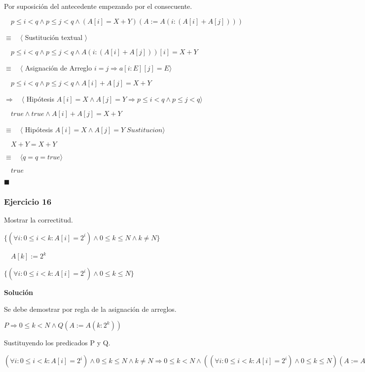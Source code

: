 \documentclass[hidelinks]{article}
\begin{document}
Por suposición del antecedente empezando por el consecuente.\par

$\quad p \leq i < q \land p \leq j < q \land (A[i] = X + Y)(A := A(i:(A[i]+A[j])))$\par
$\equiv \quad \langle$ Sustitución textual $ \rangle$\par
$\quad p \leq i < q \land p \leq j < q \land A(i:(A[i]+A[j]))[i] = X + Y$\par
$\equiv \quad \langle$ Asignación de Arreglo $ i = j \Rightarrow a[i:E][j] = E \rangle$\par
$\quad p \leq i < q \land p \leq j < q \land A[i]+A[j] = X + Y$\par
$\Rightarrow \quad \langle$ Hipótesis $ A[i] = X \land A[j] = Y \Rightarrow p \leq i < q \land p \leq j < q \rangle$\par
$\quad true \land true \land A[i]+A[j] = X + Y$\par
$\equiv \quad \langle$ Hipótesis $ A[i] = X \land A[j] = Y \; Sustitucion \rangle$\par
$\quad  X + Y = X + Y$\par
$\equiv \quad \langle q = q = true \rangle $\par
$\quad  true$\par
$\blacksquare$\par

\newpage

\subsubsection{Ejercicio 16}


Mostrar la correctitud.\par
$\{ (\forall i : 0 \leq i < k : A[i] = 2^i) \land 0 \leq k \leq N \land k \neq N\}$\par
$\quad A[k] := 2^k$\par
$\{ (\forall i : 0 \leq i < k : A[i] = 2^i) \land 0 \leq k \leq N\}$\par

\textbf{Solución}\par

Se debe demostrar por regla de la asignación de arreglos.\par
$P \Rightarrow 0 \leq k < N \land Q(A := A(k : 2^k))$\par
Sustituyendo los predicados P y Q.\par
$(\forall i : 0 \leq i < k : A[i] = 2^i) \land 0 \leq k \leq N \land k \neq N \Rightarrow 0 \leq k < N \land ((\forall i : 0 \leq i < k : A[i] = 2^i) \land 0 \leq k \leq N)(A := A(k : 2^k))$\par
\end{document}
